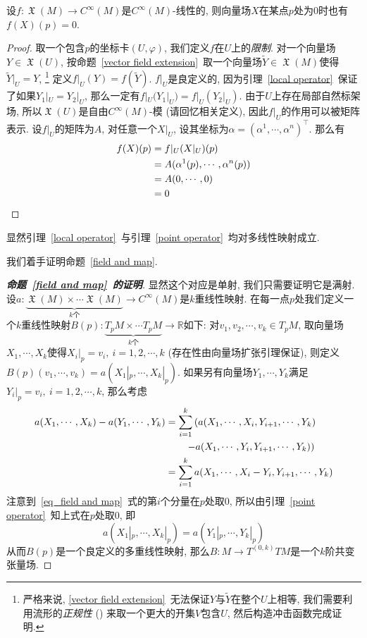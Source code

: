 \begin{lem}\label{point operator}
    设$f:\mfrakX(M)\to C^\infty(M)$是$C^\infty(M)$-线性的, 则向量场$X$在某点$p$处为$0$时也有$f(X)(p)=0$.
\end{lem}
\begin{proof}
    取一个包含$p$的坐标卡$(U,\varphi)$, 我们定义$f$在$U$上的\textit{限制}.
    对一个向量场$Y\in\mfrakX(U)$, 按命题~\ref{vector field extension}~取一个向量场$\widetilde{Y}\in\mfrakX(M)$使得$\widetilde{Y}|_U=Y$,
    \footnote{严格来说, \ref{vector field extension}~无法保证$Y$与$\widetilde{Y}$在整个$U$上相等, 我们需要利用流形的\textit{正规性} (\Parencite[定理4.81]{Lee_IntroTopoMani}) 来取一个更大的开集$V$包含$U$, 然后构造冲击函数完成证明.}
    定义$f|_U(Y)=f(\widetilde{Y})$.
    $f|_U$是良定义的, 因为引理~\ref{local operator}~保证了如果$Y_1|_U=Y_2|_U$, 那么一定有$f|_U(Y_1|_U)=f|_U(Y_2|_U)$.
    由于$U$上存在局部自然标架场, 所以$\mfrakX(U)$是自由$C^\infty(M)$-模 (请回忆相关定义),
    因此$f|_U$的作用可以被矩阵表示.
    设$f|_U$的矩阵为$A$, 对任意一个$X|_U$, 设其坐标为$\alpha=(\alpha^1,\cdots,\alpha^n)^\top$.
    那么有
    \begin{align*}
        f(X)(p)&=f|_U(X|_U)(p)\\
        &=A(\alpha^1(p),\cdots,\alpha^n(p))\\
        &=A(0,\cdots,0)\\
        &=0\qedhere
    \end{align*}
\end{proof}

\begin{col}
    显然引理~\ref{local operator}~与引理~\ref{point operator}~均对多线性映射成立.
\end{col}

我们着手证明命题~\ref{field and map}.
\begin{proof}[{\bf 命题~\ref{field and map}~的证明}]
    显然这个对应是单射, 我们只需要证明它是满射.
    设$a:\underbrace{\mfrakX(M)\times\cdots\mfrakX(M)}_{k\text{个}}\to C^\infty(M)$是$k$重线性映射.
    在每一点$p$处我们定义一个$k$重线性映射$B(p):\underbrace{T_pM\times\cdots T_pM}_{k\text{个}}\to\mathbb{R}$如下:
    对$v_1,v_2,\cdots,v_k\in T_pM$, 取向量场$X_1,\cdots,X_k$使得$X_i|_p=v_i,\ i=1,2,\cdots,k$ (存在性由向量场扩张引理保证),
    则定义$B(p)(v_1,\cdots,v_k)=a(X_1|_p,\cdots,X_k|_p)$.
    如果另有向量场$Y_1,\cdots,Y_k$满足$Y_i|_p=v_i,\ i=1,2,\cdots,k$, 那么考虑
    \begin{align}
        a(X_1,\cdots,X_k)-a(Y_1,\cdots,Y_k)&=\sum_{i=1}^k\left(a(X_1,\cdots,X_i,Y_{i+1},\cdots,Y_k)\right.\notag\\
        &\qquad\left.-a(X_1,\cdots,Y_i,Y_{i+1},\cdots,Y_k)\right)\notag\\
        &=\sum_{i=1}^ka(X_1,\cdots,X_i-Y_i,Y_{i+1},\cdots,Y_k)\label{eq_field and map}
    \end{align}
    注意到~\eqref{eq_field and map}~式的第$i$个分量在$p$处取$0$, 所以由引理~\ref{point operator}~知上式在$p$处取$0$, 即
    \[a(X_1|_p,\cdots,X_k|_p)=a(Y_1|_p,\cdots,Y_k|_p)\]
    从而$B(p)$是一个良定义的多重线性映射, 那么$B:M\to T^{(0,k)}TM$是一个$k$阶共变张量场.
\end{proof}

